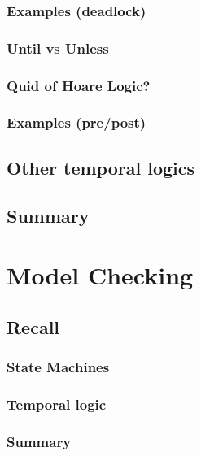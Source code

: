 \documentclass[12pt, a4paper]{book}
\begin{document}
  \subsubsection{Examples (deadlock)}
  \label{subs:Examples (deadlock)}
  \subsubsection{Until vs Unless}
  \label{subs:Until vs Unless}
  \subsubsection{Quid of Hoare Logic?}
  \label{subs:Quid of Hoare Logic?}
  \subsubsection{Examples (pre/post)}
  \label{subs:Examples (pre/post)}
  \subsection{Other temporal logics}
  \label{sub:Other temporal logics}
  \subsection{Summary}
  \label{sub:Summary}






  \section{Model Checking}
  \label{sec:Model Checking}
  \subsection{Recall}
  \label{sub:Recall}
  \subsubsection{State Machines}
  \label{subs:State Machines}
  \subsubsection{Temporal logic}
  \label{subs:Temporal logic}
  \subsubsection{Summary}
  \label{subs:Summary}
\end{document}

